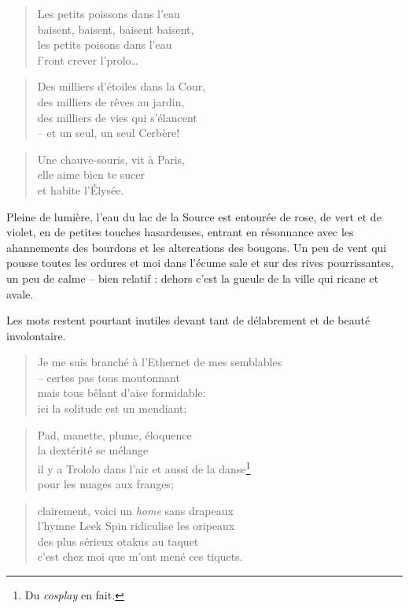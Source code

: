   \begin{verse}
    Les petits poissons dans l’eau\\
    baisent, baisent, baisent baisent,\\
    les petits poisons dans l’eau\\
    f’ront crever l’prolo…
  \end{verse}
  \begin{verse}
    Des milliers d’étoiles dans la Cour,\\
    des milliers de rêves au jardin,\\
    des milliers de vies qui s’élancent\\
    -- et un seul, un seul Cerbère!
  \end{verse}
  \begin{verse}
    Une chauve-souris, vit à Paris,\\
    elle aime bien te sucer\\
    et habite l’Élysée.
  \end{verse}

  Pleine de lumière, l’eau du lac de la Source est entourée de rose, de vert
  et de violet, en de petites touches hasardeuses, entrant en résonnance
  avec les ahannements des bourdons et les altercations des bougons. Un peu
  de vent qui pousse toutes les ordures et moi dans l’écume sale et sur des
  rives pourrissantes, un peu de calme -- bien relatif : dehors c’est la 
  gueule de la ville qui ricane et avale.

  Les mots restent pourtant inutiles devant tant de délabrement et de beauté
  involontaire.

  \begin{verse}
    Je me suis branché à l’Ethernet de mes semblables\\
    -- certes pas tous moutonnant\\
    mais tous bêlant d’aise formidable:\\
    ici la solitude est un mendiant;
  \end{verse}
  \begin{verse}
    Pad, manette, plume, éloquence\\
    la dextérité se mélange\\
    il y a Trololo dans l’air et aussi de la danse\footnote{Du \emph{cosplay} en fait.}\\
    pour les nuages aux franges;
  \end{verse}
  \begin{verse}
    clairement, voici un \emph{home} sans drapeaux\\
    l’hymne Leek Spin ridiculise les oripeaux\\
    des plus sérieux otakus au taquet\\
    c’est chez moi que m’ont mené ces tiquets.
  \end{verse}

